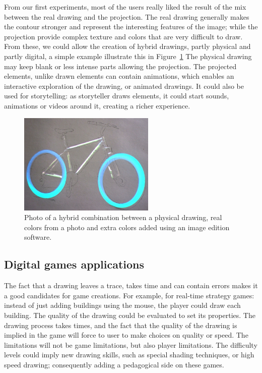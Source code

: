 \documentclass{article}
\begin{document}
From our first experiments, most of the users really liked the result of the mix between the real drawing and the projection. The real drawing generally makes the contour stronger and represent the interesting features of the image; while the projection provide complex texture and colors that are very difficult to draw. From these, we could allow the creation of hybrid drawings, partly physical and partly digital, a simple example illustrate this in Figure~\ref{fig:velo} The physical drawing may keep blank or less intense parts allowing the projection. The projected elements, unlike drawn elements can contain animations, which enables an interactive exploration of the drawing, or animated drawings. It could also be used for storytelling: as storyteller draws elements, it could start sounds, animations or videos around it, creating a richer experience. 

\begin{figure}[!h]
\centering
\includegraphics[width=65mm]{velo2}
\caption{Photo of a hybrid combination between a physical drawing, real colors from a photo and extra colors added using an image edition software. \vspace{-0.3cm}}
\label{fig:velo}
\end{figure}


\subsection*{Digital games applications}

The fact that a drawing leaves a trace, takes time and can contain errors makes it a good candidates for game creations. For example, for real-time strategy games: instead of just adding buildings using the mouse, the player could draw each building.  
The quality of the drawing could be evaluated to set its properties. The drawing process takes times, and the fact that the quality of the drawing is implied in the game will force to user to make choices on quality or speed. The limitations will not be game limitations, but also player limitations. 
The difficulty levels could imply new drawing skills, such as special shading techniques, or high speed drawing; consequently adding a pedagogical side on these games. 
\end{document}
